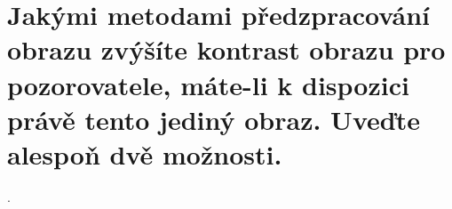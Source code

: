 \section{Jakými metodami předzpracování obrazu zvýšíte kontrast obrazu pro pozorovatele, máte-li k dispozici právě tento 
jediný obraz. Uveďte alespoň dvě možnosti.}.